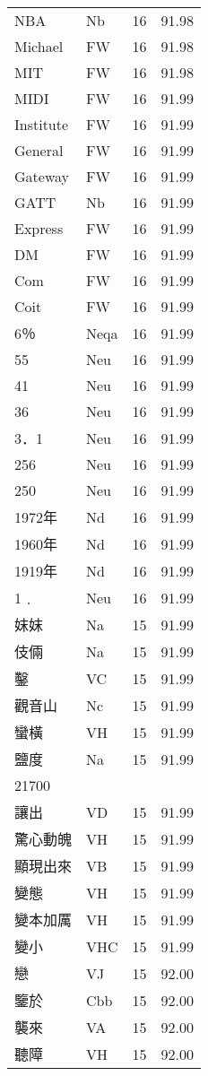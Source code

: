 \documentclass[twocolumn]{book}
\begin{document}
\begin{supertabular}{llrr}
NBA & Nb & 16 &  91.98\\
Michael & FW & 16 &  91.98\\
MIT & FW & 16 &  91.98\\
MIDI & FW & 16 &  91.99\\
Institute & FW & 16 &  91.99\\
General & FW & 16 &  91.99\\
Gateway & FW & 16 &  91.99\\
GATT & Nb & 16 &  91.99\\
Express & FW & 16 &  91.99\\
DM & FW & 16 &  91.99\\
Com & FW & 16 &  91.99\\
Coit & FW & 16 &  91.99\\
6％ & Neqa & 16 &  91.99\\
55 & Neu & 16 &  91.99\\
41 & Neu & 16 &  91.99\\
36 & Neu & 16 &  91.99\\
3．1 & Neu & 16 &  91.99\\
256 & Neu & 16 &  91.99\\
250 & Neu & 16 &  91.99\\
1972年 & Nd & 16 &  91.99\\
1960年 & Nd & 16 &  91.99\\
1919年 & Nd & 16 &  91.99\\
1﹒ & Neu & 16 &  91.99\\
妺妺 & Na & 15 &  91.99\\
伎倆 & Na & 15 &  91.99\\
鑿 & VC & 15 &  91.99\\
觀音山 & Nc & 15 &  91.99\\
蠻橫 & VH & 15 &  91.99\\
鹽度 & Na & 15 &  91.99\\
21700\\
讓出 & VD & 15 &  91.99\\
驚心動魄 & VH & 15 &  91.99\\
顯現出來 & VB & 15 &  91.99\\
變態 & VH & 15 &  91.99\\
變本加厲 & VH & 15 &  91.99\\
變小 & VHC & 15 &  91.99\\
戀 & VJ & 15 &  92.00\\
鑒於 & Cbb & 15 &  92.00\\
襲來 & VA & 15 &  92.00\\
聽障 & VH & 15 &  92.00\\

\end{supertabular}
\end{document}
